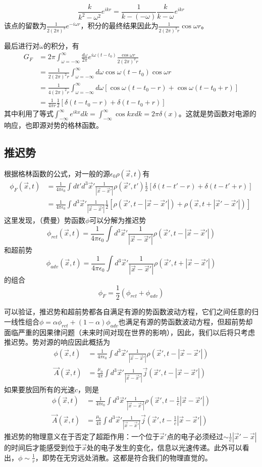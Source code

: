 \documentclass[a4paper,11pt]{ctexart}
\newcommand{\beq}{\begin{equation}}
\newcommand{\eeq}{\end{equation}}
\newcommand{\bea}{\begin{equation}\begin{aligned}}
\newcommand{\eea}{\end{aligned}\end{equation}}
\newcommand{\epv}{\epsilon_0}
\begin{document}
\beq
\frac{k}{k^2 - \omega^2} e^{ikr} = \frac{1}{k-(-\omega)} \frac{k}{k-\omega}e^{ikr}
\eeq
该点的留数为$\frac{1}{2(2\pi)^3} e^{-i\omega r}$，积分的最终结果因此为$\frac{1}{2(2\pi)^2 r} \cos \omega r$。\par
最后进行对$\omega$的积分，有
\bea
G_F &= 2\pi \int_{\omega = -\infty}^\infty \frac{d\omega}{2\pi} e^{i\omega (t-t_0) }\frac{ \cos \omega r }{2(2\pi)^2r} \\
& = \frac{1}{2(2\pi)^2 r}  \int_{\omega = -\infty}^\infty d\omega \cos \omega(t-t_0) \cos \omega r \\
&= \frac{1}{4(2\pi)^2 r} \int_{\omega = -\infty}^\infty d\omega \left[ \cos \omega(t-t_0 -r) + \cos \omega(t-t_0 + r)\right] \\
&= \frac{1}{4 \pi r} \frac{1}{2}\left[\delta (t-t_0-r) + \delta (t-t_0+r) \right]
\eea
其中利用了等式$\int_{-\infty}^\infty e^{ikx} dk = \int_{-\infty}^\infty \cos kx dk = 2\pi \delta(x)$。这就是势函数对电源的响应，也即源对势的格林函数。
\subsection{推迟势}
根据格林函数的公式，对一般的源$\epv \rho(\vec{x},t)$有
\bea
\phi_F(\vec{x},t) &=\frac{1}{4\pi \epv}  \int dt'd^3 \vec{x}' \frac{1}{|\vec{x}-\vec{x}'|} \rho(\vec{x}',t') \frac{1}{2}\left[\delta (t-t'-r) + \delta (t-t'+r) \right]\\
&= \frac{1}{4\pi \epv} \int d^3 \vec{x}' \frac{1}{|\vec{x}-\vec{x}'|}\frac{1}{2} \left[\rho(\vec{x}',t-|\vec{x}-\vec{x}'|) + \rho(\vec{x},t+|\vec{x}'-\vec{x}'|) \right]
\eea
这里发现，（费曼）势函数$\phi$可以分解为推迟势
\beq
\phi_{ret} (\vec{x},t) = \frac{1}{4\pi \epv} \int d^3 \vec{x}' \frac{1}{|\vec{x}-\vec{x}'|} \rho(\vec{x}',t-|\vec{x}-\vec{x}'|) 
\eeq
和超前势
\beq
\phi_{adv} (\vec{x},t) = \frac{1}{4\pi \epv} \int d^3 \vec{x}' \frac{1}{|\vec{x}-\vec{x}'|} \rho(\vec{x}',t+|\vec{x}-\vec{x}'| )
\eeq
的组合
\beq
\phi_F = \frac{1}{2}(\phi_{ret} + \phi_{adv})
\eeq
\par
可以验证，推迟势和超前势都各自满足有源的势函数波动方程，它们之间任意的归一线性组合$\phi = \alpha \phi_{ret} + (1-\alpha) \phi_{adv}$也满足有源的势函数波动方程，但超前势却面临严重的因果律问题（未来时间对现在世界的影响），因此，我们以后将只考虑推迟势。势对源的响应因此概括为
\bea \label{retp}
\phi(\vec x,t) &= \frac{1}{4\pi \epv} \int d^3 \vec{x}' \frac{1}{|\vec{x}-\vec{x}'|} \rho(\vec{x}',t-|\vec{x}-\vec{x}'|)  \\
\vec A (\vec x,t) &= \frac{\mu_0 }{4\pi } \int d^3 \vec{x}' \frac{1}{|\vec{x}-\vec{x}'|} \vec j (\vec{x}',t-|\vec{x}-\vec{x}'|) 
\eea
如果要放回所有的光速$c$，则是
\bea
\phi(\vec x,t) &= \frac{1}{4\pi \epv} \int d^3 \vec{x}' \frac{1}{|\vec{x}-\vec{x}'|} \rho(\vec{x}',t-\frac{1}{c}|\vec{x}-\vec{x}'|)  \\
\vec A (\vec x,t) &= \frac{\mu_0 }{4\pi } \int d^3 \vec{x}' \frac{1}{|\vec{x}-\vec{x}'|} \vec j (\vec{x}',t-\frac{1}{c}|\vec{x}-\vec{x}'|) 
\eea
推迟势的物理意义在于否定了超距作用：一个位于$\vec{x}'$点的电子必须经过$\sim \frac{1}{c} \left| \vec{x}' - \vec{x} \right|$的时间后才能感受到位于$\vec{x}$处的电子发生的变化，信息以光速传递。此外可以看出，$\phi \sim \frac{1}{r}$，即势在无穷远处消散。这都是符合我们的物理直觉的。
\end{document}
